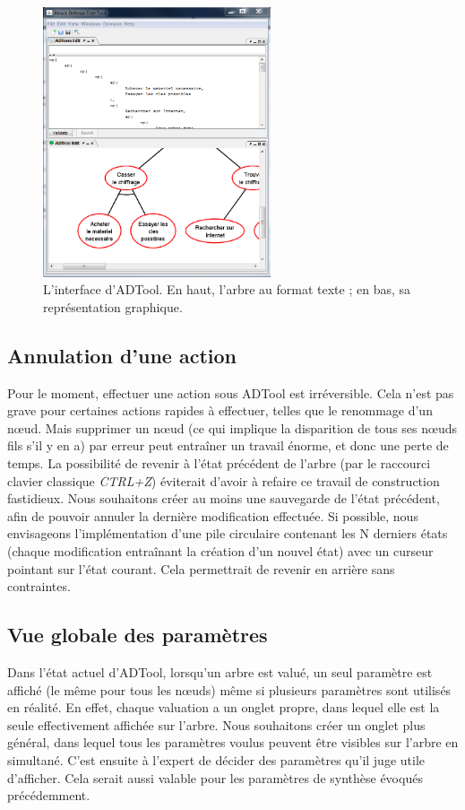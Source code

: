 		\begin{figure}[h]
			\centering
			\includegraphics[width=0.6\textwidth]{figure/interface_adtool.png}
			\caption{L'interface d'ADTool. En haut, l'arbre au format texte ; en bas, sa représentation graphique.}
			\label{fig:int_adTool}
		\end{figure}
	
	\subsection{Annulation d'une action}	
		Pour le moment, effectuer une action sous ADTool est irréversible. Cela n'est pas grave pour certaines actions rapides à effectuer, telles que le renommage d'un nœud. Mais supprimer un nœud (ce qui implique la disparition de tous ses nœuds fils s'il y en a) par erreur peut entraîner un travail énorme, et donc une perte de temps. La possibilité de revenir à l'état précédent de l'arbre (par le raccourci clavier classique \emph{CTRL+Z}) éviterait d'avoir à refaire ce travail de construction fastidieux. Nous souhaitons créer au moins une sauvegarde de l'état précédent, afin de pouvoir annuler la dernière modification effectuée. Si possible, nous envisageons l'implémentation d'une pile circulaire contenant les N derniers états (chaque modification entraînant la création d'un nouvel état) avec un curseur pointant sur l'état courant. Cela permettrait de revenir en arrière sans contraintes. %

	\subsection{Vue globale des paramètres}
		Dans l'état actuel d'ADTool, lorsqu'un arbre est valué, un seul paramètre est affiché (le même pour tous les nœuds) même si plusieurs paramètres sont utilisés en réalité. En effet, chaque valuation a un onglet propre, dans lequel elle est la seule effectivement affichée sur l'arbre.%
		Nous souhaitons créer un onglet plus général, dans lequel tous les paramètres voulus peuvent être visibles sur l'arbre en simultané. C'est ensuite à l'expert de décider des paramètres qu'il juge utile d'afficher. Cela serait aussi valable pour les paramètres de synthèse évoqués précédemment.\\
	

